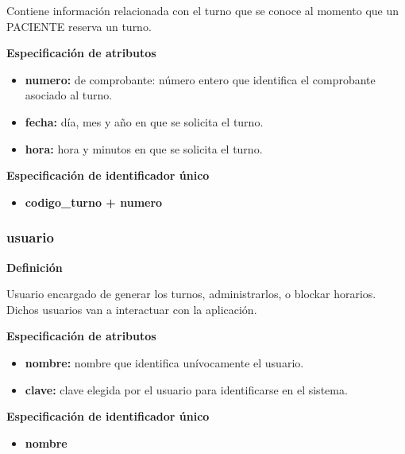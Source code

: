 \documentclass[a4paper,11pt]{article}
\begin{document}
Contiene información relacionada con el turno que se conoce al momento que un 
PACIENTE reserva un turno.

\textbf{Especificación de atributos}

\begin{itemize}

     \item \textbf{numero:} de comprobante: número entero que identifica el comprobante asociado 
     al turno.

     \item \textbf{fecha:} día, mes y año en que se solicita el turno.

     \item \textbf{hora:} hora y minutos en que se solicita el turno.

\end{itemize}

\textbf{Especificación de identificador único}

\begin{itemize}

     \item \textbf{codigo\_turno + numero}


\end{itemize}

\subsubsection{\textbf{usuario}}

\textbf{Definición}

Usuario encargado de generar los turnos, administrarlos, o blockar horarios.
Dichos usuarios van a interactuar con la aplicación.

\textbf{Especificación de atributos}

\begin{itemize}

     \item \textbf{nombre:} nombre que identifica unívocamente el usuario. 
	 
	 \item \textbf{clave:} clave elegida por el usuario para identificarse en el sistema. 
\end{itemize}

\textbf{Especificación de identificador único}

\begin{itemize}

     \item \textbf{nombre}

\end{itemize}
\end{document}
